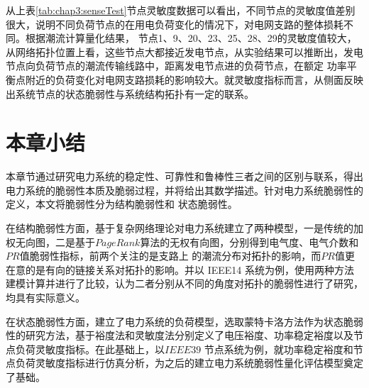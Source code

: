 从上表\ref{tab:chap3:senseTest}节点灵敏度数据可以看出，不同节点的灵敏度值差别很大，说明不同负荷节点的在用电负荷变化的情况下，对电网支路的整体损耗不同。根据潮流计算量化结果，
节点1、9、20、23、25、28、29的灵敏度值较大，从网络拓扑位置上看，这些节点大都接近发电节点，从实验结果可以推断出，发电节点向负荷节点的潮流传输线路中，距离发电节点进的负荷节点，在额定
功率平衡点附近的负荷变化对电网支路损耗的影响较大。就灵敏度指标而言，从侧面反映出系统节点的状态脆弱性与系统结构拓扑有一定的联系。




\section{本章小结}
\label{sec:sum3}

本章节通过研究电力系统的稳定性、可靠性和鲁棒性三者之间的区别与联系，得出电力系统的脆弱性本质及脆弱过程，并将给出其数学描述。针对电力系统脆弱性的定义，本文将脆弱性分为结构脆弱性和
状态脆弱性。

在结构脆弱性方面，基于复杂网络理论对电力系统建立了两种模型，一是传统的加权无向图，二是基于$PageRank$算法的无权有向图，分别得到电气度、电气介数和$PR$值脆弱性指标，前两个关注的是支路上
的潮流分布对拓扑的影响，而$PR$值更在意的是有向的链接关系对拓扑的影响。并以 IEEE14 系统为例，使用两种方法建模计算并进行了比较，认为二者分别从不同的角度对拓扑的脆弱性进行了研究，
均具有实际意义。

在状态脆弱性方面，建立了电力系统的负荷模型，选取蒙特卡洛方法作为状态脆弱性的研究方法，基于裕度法和灵敏度法分别定义了电压裕度、功率稳定裕度以及节点负荷灵敏度指标。在此基础上，以$IEEE39$
节点系统为例，就功率稳定裕度和节点负荷灵敏度指标进行仿真分析，为之后的建立电力系统脆弱性量化评估模型奠定了基础。



